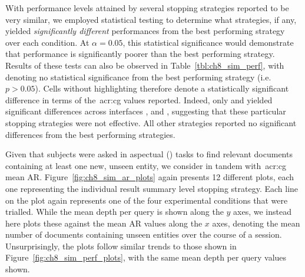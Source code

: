 With performance levels attained by several stopping strategies reported to be very similar, we employed statistical testing to determine what strategies, if any, yielded \emph{significantly different} performances from the best performing strategy over each condition. At $\alpha=0.05$, this statistical significance would demonstrate that performance is significantly poorer than the best performing strategy. Results of these tests can also be observed in Table~\ref{tbl:ch8_sim_perf}, with  denoting no statistical significance from the best performing strategy (i.e. $p>0.05$). Cells without highlighting therefore denote a statistically significant difference in terms of the~\gls{acr:cg} values reported. Indeed, only  and  yielded significant differences across interfaces ,  and , suggesting that these particular stopping strategies were not effective. All other strategies reported no significant differences from the best performing strategies.

Given that subjects were asked in aspectual () tasks to find relevant documents containing at least one new, unseen entity, we consider in tandem with~\gls{acr:cg} mean AR. Figure~\ref{fig:ch8_sim_ar_plots} again presents 12 different plots, each one representing the individual result summary level stopping strategy. Each line on the plot again represents one of the four experimental conditions that were trialled. While the mean depth per query is shown along the $y$ axes, we instead here plots these against the mean AR values along the $x$ axes, denoting the mean number of documents containing unseen entities over the course of a session. Unsurprisingly, the plots follow similar trends to those shown in Figure~\ref{fig:ch8_sim_perf_plots}, with the same mean depth per query values shown.

